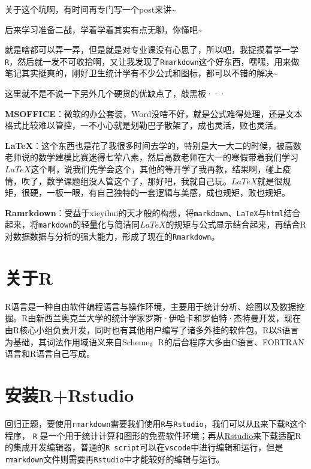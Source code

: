 \documentclass[
]{book}
\theoremstyle{definition}
\theoremstyle{definition}
\theoremstyle{definition}
\theoremstyle{definition}
\theoremstyle{remark}
\begin{document}
关于这个坑啊，有时间再专门写一个post来讲\textasciitilde{}

后来学习准备二战，学着学着其实有点无聊，你懂吧\textasciitilde{}

就是啥都可以弄一弄，但是就是对专业课没有心思了，所以吧，我捉摸着学一学\texttt{R}，然后就一发不可收拾啊，又让我发现了\texttt{Rmarkdown}这个好东西，嘿嘿，用来做笔记其实挺爽的，刚好卫生统计学有不少公式和图标，都可以不错的解决\textasciitilde{}

这里就不是不说一下另外几个硬货的优缺点了，敲黑板···

\textbf{MSOFFICE}：微软的办公套装，Word没啥不好，就是公式难得处理，还是文本格式比较难以管控，一不小心就是划勒巴子散架了，成也灵活，败也灵活。

\textbf{LaTeX}：这个东西也是花了我很多时间去学的，特别是大一大二的时候，被高数老师说的数学建模比赛迷得七荤八素，然后高数老师在大一的寒假带着我们学习\(LaTeX\)这个啊，说我们先学会这个，其他的等开学了我再教，结果啊，碰上疫情，吹了，数学课题组没人管这个了，那好吧，我就自己玩。\(LaTeX\)就是很规矩，很硬，一板一眼，有自己独特的一套逻辑与美感，成也规矩，败也规矩。

\textbf{Ramrkdown}：受益于xieyihui的天才般的构想，将\texttt{markdown}、\texttt{LaTeX}与\texttt{html}结合起来，将\texttt{markdown}的轻量化与简洁同\(LaTeX\)的规矩与公式显示结合起来，再结合R对数据数据与分析的强大能力，形成了现在的\texttt{Rmarkdown}。

\hypertarget{ux5173ux4e8er}{%
\section{关于R}\label{ux5173ux4e8er}}

R语言是一种自由软件编程语言与操作环境，主要用于统计分析、绘图以及数据挖掘。R由新西兰奥克兰大学的统计学家罗斯·伊哈卡和罗伯特·杰特曼开发，现在由R核心小组负责开发，同时也有其他用户编写了诸多外挂的软件包。R以S语言为基础，其词法作用域语义来自Scheme。R的后台程序大多由C语言、FORTRAN语言和R语言自己写成。

\hypertarget{ux5b89ux88c5rrstudio}{%
\section{安装R+Rstudio}\label{ux5b89ux88c5rrstudio}}

回归正题，要使用\texttt{rmarkdown}需要我们使用\texttt{R}与\texttt{Rstudio}，我们可以从\href{https://www.r-project.org/}{R}来下载\texttt{R}这个程序，
\texttt{R} 是一个用于统计计算和图形的免费软件环境；再从\href{https://www.rstudio.com/categories/rstudio-ide/}{Rstudio}来下载适配R的集成开发编辑器，普通的\texttt{R\ script}可以在\texttt{vscode}中进行编辑和运行，但是\texttt{rmarkdown}文件则需要再\texttt{Rstudio}中才能较好的编辑与运行。
\end{document}
